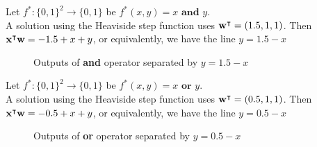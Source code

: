 \begin{example}
    Let $f^*:\{0,1\}^2\to\{0,1\}$ be $f^*(x,y)=x\textbf{ and }y$. \\
    A solution using the Heaviside step function uses $\vw^\intercal = (1.5,1,1)$. Then $\vx^\intercal\vw = -1.5+x+y$, or equivalently, we have the line $y=1.5-x$
    \begin{figure}
    \centering
    \caption{Outputs of \textbf{and} operator separated by $y=1.5-x$}
    \label{fig:9.1Ex2}
\end{figure}
\end{example}

\begin{example}
    Let $f^*:\{0,1\}^2\to\{0,1\}$ be $f^*(x,y)=x\textbf{ or }y$. \\
    A solution using the Heaviside step function uses $\vw^\intercal = (0.5,1,1)$. Then $\vx^\intercal\vw = -0.5+x+y$, or equivalently, we have the line $y=0.5-x$
    \begin{figure}
    \centering
    \caption{Outputs of \textbf{or} operator separated by $y=0.5-x$}
    \label{fig:9.1Ex2}
\end{figure}
\end{example}

